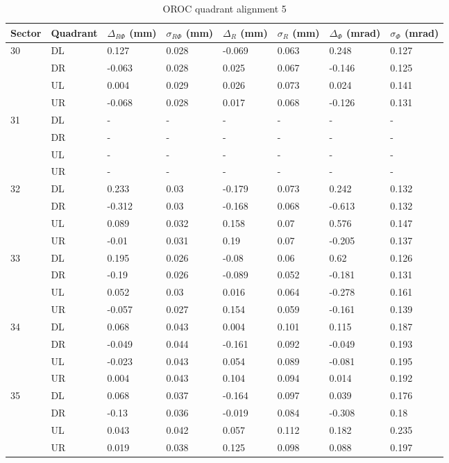 \begin{table}
\caption{OROC quadrant alignment 5}
\begin{tabular}{|l|l|l|l|l|l|l|l|} \hline
Sector & Quadrant & $\Delta_{R\Phi}$ (mm)& $\sigma_{R\Phi}$ (mm) &
 $\Delta_{R}$ (mm)& $\sigma_{R}$ (mm) & $\Delta_{\Phi}$ (mrad)& $\sigma_{\Phi}$ (mrad)\\ \hline
30&DL&0.127&0.028&-0.069&0.063&0.248&0.127\\ \hline
&DR&-0.063&0.028&0.025&0.067&-0.146&0.125\\ \hline
&UL&0.004&0.029&0.026&0.073&0.024&0.141\\ \hline
&UR&-0.068&0.028&0.017&0.068&-0.126&0.131\\ \hline
31&DL&-&-&-&-&-&-\\ \hline
&DR&-&-&-&-&-&-\\ \hline
&UL&-&-&-&-&-&-\\ \hline
&UR&-&-&-&-&-&-\\ \hline
32&DL&0.233&0.03&-0.179&0.073&0.242&0.132\\ \hline
&DR&-0.312&0.03&-0.168&0.068&-0.613&0.132\\ \hline
&UL&0.089&0.032&0.158&0.07&0.576&0.147\\ \hline
&UR&-0.01&0.031&0.19&0.07&-0.205&0.137\\ \hline
33&DL&0.195&0.026&-0.08&0.06&0.62&0.126\\ \hline
&DR&-0.19&0.026&-0.089&0.052&-0.181&0.131\\ \hline
&UL&0.052&0.03&0.016&0.064&-0.278&0.161\\ \hline
&UR&-0.057&0.027&0.154&0.059&-0.161&0.139\\ \hline
34&DL&0.068&0.043&0.004&0.101&0.115&0.187\\ \hline
&DR&-0.049&0.044&-0.161&0.092&-0.049&0.193\\ \hline
&UL&-0.023&0.043&0.054&0.089&-0.081&0.195\\ \hline
&UR&0.004&0.043&0.104&0.094&0.014&0.192\\ \hline
35&DL&0.068&0.037&-0.164&0.097&0.039&0.176\\ \hline
&DR&-0.13&0.036&-0.019&0.084&-0.308&0.18\\ \hline
&UL&0.043&0.042&0.057&0.112&0.182&0.235\\ \hline
&UR&0.019&0.038&0.125&0.098&0.088&0.197\\ \hline
\end{tabular}
\label{table:QudrantAlignement}
\end{table}
